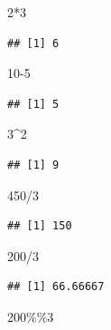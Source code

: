 \documentclass[
]{book}
\newenvironment{Shaded}{\begin{snugshade}}{\end{snugshade}}
\newcommand{\DecValTok}[1]{\textcolor[rgb]{0.00,0.00,0.81}{#1}}
\newcommand{\SpecialCharTok}[1]{\textcolor[rgb]{0.00,0.00,0.00}{#1}}
\begin{document}
\begin{Shaded}
\begin{Highlighting}[]
\DecValTok{2}\SpecialCharTok{*}\DecValTok{3}
\end{Highlighting}
\end{Shaded}

\begin{verbatim}
## [1] 6
\end{verbatim}

\begin{Shaded}
\begin{Highlighting}[]
\DecValTok{10{-}5}
\end{Highlighting}
\end{Shaded}

\begin{verbatim}
## [1] 5
\end{verbatim}

\begin{Shaded}
\begin{Highlighting}[]
\DecValTok{3}\SpecialCharTok{\^{}}\DecValTok{2}
\end{Highlighting}
\end{Shaded}

\begin{verbatim}
## [1] 9
\end{verbatim}

\begin{Shaded}
\begin{Highlighting}[]
\DecValTok{450}\SpecialCharTok{/}\DecValTok{3}
\end{Highlighting}
\end{Shaded}

\begin{verbatim}
## [1] 150
\end{verbatim}

\begin{Shaded}
\begin{Highlighting}[]
\DecValTok{200}\SpecialCharTok{/}\DecValTok{3}
\end{Highlighting}
\end{Shaded}

\begin{verbatim}
## [1] 66.66667
\end{verbatim}

\begin{Shaded}
\begin{Highlighting}[]
\DecValTok{200}\SpecialCharTok{\%\%}\DecValTok{3}
\end{Highlighting}
\end{Shaded}
\end{document}

